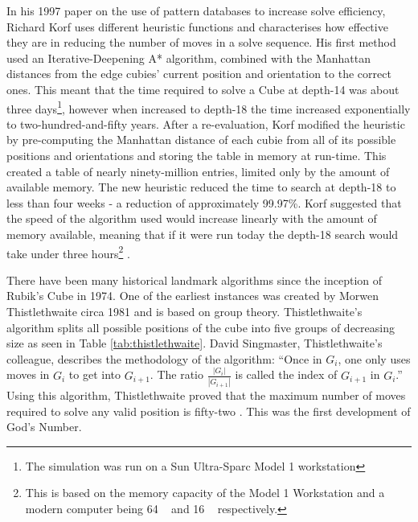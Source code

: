 \documentclass{report}
\newcommand{\depth}[1]{depth-#1}
\begin{document}
    In his 1997 paper \cite{Korf1997} on the use of pattern databases to increase solve efficiency, Richard Korf uses different heuristic functions and characterises how effective they are in reducing the number of moves in a solve sequence. His first method used an Iterative-Deepening A* algorithm, combined with the Manhattan distances from the edge cubies' current position and orientation to the correct ones. This meant that the time required to solve a Cube at \depth{14} was about three days\footnote{The simulation was run on a Sun Ultra-Sparc Model 1 workstation}, however when increased to \depth{18} the time increased exponentially to two-hundred-and-fifty years. After a re-evaluation, Korf modified the heuristic by pre-computing the Manhattan distance of each cubie from all of its possible positions and orientations and storing the table in memory at run-time. This created a table of nearly ninety-million entries, limited only by the amount of available memory. The new heuristic reduced the time to search at \depth{18} to less than four weeks - a reduction of approximately 99.97\%. Korf suggested that the speed of the algorithm used would increase linearly with the amount of memory available, meaning that if it were run today the \depth{18} search would take under three hours\footnote{This is based on the memory capacity of the Model 1 Workstation and a modern computer being 64 \si{\mega\byte} and 16 \si{\giga\byte} respectively.} \cite{Korf1997}.
    
    There have been many historical landmark algorithms since the inception of Rubik's Cube in 1974. One of the earliest instances was created by Morwen Thistlethwaite circa 1981 and is based on group theory. Thistlethwaite's algorithm splits all possible positions of the cube into five groups of decreasing size as seen in Table \ref{tab:thistlethwaite}. David Singmaster, Thistlethwaite's colleague, describes the methodology of the algorithm: \enquote{Once in $G_i$, one only uses moves in $G_i$ to get into $G_{i+1}$. The ratio $\frac{|G_i|}{|G_{i+1}|}$ is called the index of $G_{i+1}$ in $G_i$.} Using this algorithm, Thistlethwaite proved that the maximum number of moves required to solve any valid position is fifty-two \cite{Singmaster1981}. This was the first development of God's Number.
    
\end{document}
